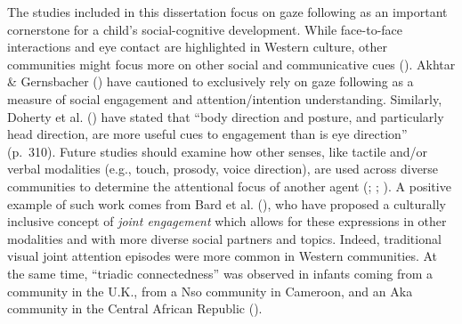\documentclass[
]{scrbook}
\begin{document}
The studies included in this dissertation focus on gaze following as an important cornerstone for a child's social-cognitive development. While face-to-face interactions and eye contact are highlighted in Western culture, other communities might focus more on other social and communicative cues (). Akhtar \& Gernsbacher () have cautioned to exclusively rely on gaze following as a measure of social engagement and attention/intention understanding. Similarly, Doherty et al. () have stated that ``body direction and posture, and particularly head direction, are more useful cues to engagement than is eye direction'' (p.~310). Future studies should examine how other senses, like tactile and/or verbal modalities (e.g., touch, prosody, voice direction), are used across diverse communities to determine the attentional focus of another agent (; ; ). A positive example of such work comes from Bard et al. (), who have proposed a culturally inclusive concept of \emph{joint engagement} which allows for these expressions in other modalities and with more diverse social partners and topics. Indeed, traditional visual joint attention episodes were more common in Western communities. At the same time, ``triadic connectedness'' was observed in infants coming from a community in the U.K., from a Nso community in Cameroon, and an Aka community in the Central African Republic ().
\end{document}
